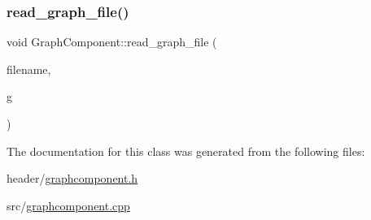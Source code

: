 \mbox{\label{class_graph_component_a680363eab8b992d739f055bd484bc000_a680363eab8b992d739f055bd484bc000}} 
\subsubsection{\texorpdfstring{read\+\_\+graph\+\_\+file()}{read\_graph\_file()}}
{\footnotesize\ttfamily void Graph\+Component\+::read\+\_\+graph\+\_\+file (\begin{DoxyParamCaption}\item[{std\+::string}]{filename,  }\item[{\hyperlink{class_graph_component_a982e0748a6e1b8dc74986f5f8b3dca5c_a982e0748a6e1b8dc74986f5f8b3dca5c}{the\+Graph} \&}]{g }\end{DoxyParamCaption})}



The documentation for this class was generated from the following files\+:\begin{DoxyCompactItemize}
\item 
header/\hyperlink{graphcomponent_8h}{graphcomponent.\+h}\item 
src/\hyperlink{graphcomponent_8cpp}{graphcomponent.\+cpp}\end{DoxyCompactItemize}
